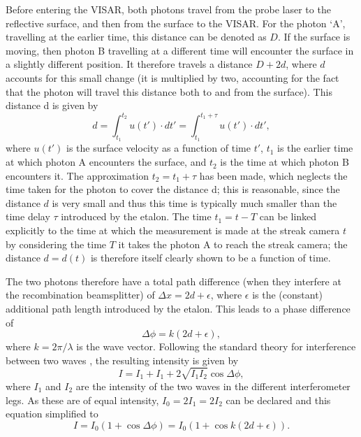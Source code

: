 Before entering the VISAR, both photons travel from the probe laser to the reflective surface, and then from the surface to the VISAR. For the photon `A', travelling at the earlier time, this distance can be denoted as $D$. If the surface is moving, then photon B travelling at a different time will encounter the surface in a slightly different position. It therefore travels a distance $D+2d$, where $d$ accounts for this small change (it is multiplied by two, accounting for the fact that the photon will travel this distance both to and from the surface). This distance d is given by \begin{equation} d = \int_{t_1}^{t_2} u(t') \cdot dt' = \int_{t_1}^{t_1 + \tau} u(t') \cdot dt',\end{equation} where $u(t')$ is the surface velocity as a function of time $t'$, $t_1$ is the earlier time at which photon A encounters the surface, and $t_2$ is the time at which photon B encounters it. The approximation $t_2 = t_1 + \tau$ has been made, which neglects the time taken for the photon to cover the distance d; this is reasonable, since the distance $d$ is very small and thus this time is typically much smaller than the time delay $\tau$ introduced by the etalon. The time $t_1 = t - T$ can be linked explicitly to the time at which the measurement is made at the streak camera $t$ by considering the time $T$ it takes the photon A to reach the streak camera; the distance $d = d(t)$ is therefore itself clearly shown to be a function of time.

The two photons therefore have a total path difference (when they interfere at the recombination beamsplitter) of $ \Delta x = 2d + \epsilon $, where $\epsilon$ is the (constant) additional path length introduced by the etalon. This leads to a phase difference of \begin{equation} \Delta\phi = k (2d + \epsilon),\end{equation} where $k = 2\pi / \lambda$ is the wave vector. Following the standard theory for interference between two waves \cite{Hecht2017}, the resulting intensity is given by  \begin{equation}I = I_1 + I_1 + 2\sqrt{I_1 I_2} \cos{\Delta \phi},\end{equation} where $I_1$ and $I_2$ are the intensity of the two waves in the different interferometer legs. As these are of equal intensity, $I_0 = 2 I_1 = 2 I_2$ can be declared and this equation simplified to \begin{equation} I = I_0 (1 + \cos{\Delta \phi}) = I_0 (1 + \cos{k (2d + \epsilon)}).\end{equation}


